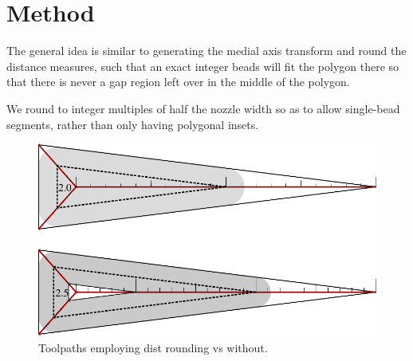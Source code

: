 \section{Method}
The general idea is similar to generating the medial axis transform and round the distance measures,
such that an exact integer beads will fit the polygon there
so that there is never a gap region left over in the middle of the polygon.

We round to integer multiples of half the nozzle width so as to allow single-bead segments, rather than only having polygonal insets.

\begin{figure}
\includegraphics[width=\columnwidth]{sources/method/rounded_vs_unrounded.pdf}
\caption{Toolpaths employing dist rounding vs without.}
\label{rounded_vs_unrounded}
\end{figure}


